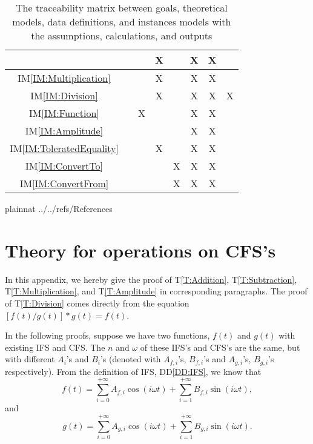 \documentclass[12pt]{article}
\newcommand{\ddref}[1]{DD\ref{#1}}
\newcommand{\tref}[1]{T\ref{#1}}
\newcommand{\iref}[1]{IM\ref{#1}}
\begin{document}
\begin{table}
\begin{tabular}{|c|c|c|c|c|c|c|c|}
		& & &X& &X&X& \\\hline
		\iref{IM:Multiplication}
		& & &X& &X&X& \\\hline
		\iref{IM:Division}
		& & &X& &X&X&X\\\hline
		\iref{IM:Function}
		& &X& & &X&X& \\\hline
		\iref{IM:Amplitude}
		& & & & &X&X& \\\hline
		\iref{IM:ToleratedEquality}
		& & &X& &X&X& \\\hline
		\iref{IM:ConvertTo}
		& & & &X&X&X& \\\hline
		\iref{IM:ConvertFrom}
		& & & &X&X&X& \\\hline		
	\end{tabular}
	\caption{The traceability matrix between goals, 
	theoretical models, data definitions, and instances models 
	with the assumptions, calculations, and outputs}
	\label{Table:Traceability}
\end{table} 
\newpage

 {plainnat}
 {../../refs/References}

\newpage
\appendix

\section{Theory for operations on CFS's}\label{Appendix:Operations}
In this appendix, we hereby give the proof of 
\tref{T:Addition}, \tref{T:Subtraction}, \tref{T:Multiplication}, 
and \tref{T:Amplitude} in corresponding paragraphs. The proof of 
\tref{T:Division} comes directly from the equation 
$[f(t)/g(t)]*g(t)=f(t)$.

In the following proofs, suppose we have two functions, 
$f(t)$ and $g(t)$ with existing IFS and CFS. The $n$ and $\omega$ of 
these IFS's and CFS's are the same, but with different $A_i$'s and $B_i$'s 
(denoted with $A_{f, i}$'s, $B_{f, i}$'s and $A_{g,i}$'s, 
$B_{g,i}$'s respectively).
From the definition of IFS, \ddref{DD:IFS}, we know that 
\begin{equation}\label{Eq:fDef}
	f(t)=\sum_{i=0}^{+\infty}A_{f, i}\cos(i\omega t)
	+\sum_{i=1}^{+\infty}B_{f, i}\sin(i\omega t),
\end{equation} and \begin{equation}\label{Eq:gDef}
	g(t)=\sum_{i=0}^{+\infty}A_{g, i}\cos(i\omega t)
	+\sum_{i=1}^{+\infty}B_{g, i}\sin(i\omega t).
\end{equation}  
\end{document}
